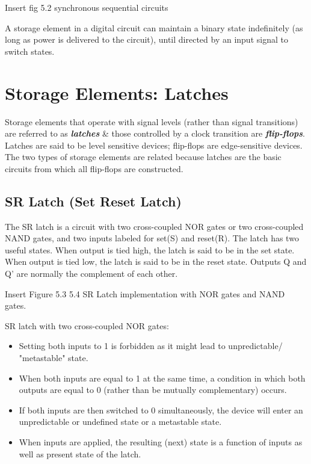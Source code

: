 \begin{highlight}
    Insert fig 5.2 synchronous sequential circuits
\end{highlight}

A storage element in a digital circuit can maintain a binary state indefinitely (as long as power is delivered to the circuit), until directed by an input signal to switch states.

\section{Storage Elements: Latches}
Storage elements that operate with signal levels (rather than signal transitions) are referred to as \textit{\textbf{latches}} \& those controlled by a clock transition are \textit{\textbf{flip-flops}}. Latches are said to be level sensitive devices; flip-flops are edge-sensitive devices. The two types of storage elements are related because latches are the basic circuits from which all flip-flops are constructed.

\subsection{SR Latch (Set Reset Latch)}
The SR latch is a circuit with two cross-coupled NOR gates or two cross-coupled NAND gates, and two inputs labeled for set(S) and reset(R). The latch has two useful states. When output is tied high, the latch is said to be in the set state. When output is tied low, the latch is said to be in the reset state. Outputs Q and Q' are normally the complement of each other.

\begin{highlight}
    Insert Figure 5.3 5.4 SR Latch implementation with NOR gates and NAND gates.
\end{highlight}

SR latch with two cross-coupled NOR gates:
\begin{itemize}
    \item Setting both inputs to 1 is forbidden as it might lead to unpredictable/ "metastable" state.
    \item When both inputs are equal to 1 at the same time, a condition in which both outputs are equal to 0 (rather than be mutually complementary) occurs.
    \item If both inputs are then switched to 0 simultaneously, the device will enter an unpredictable or undefined state or a metastable state.
    \item When inputs are applied, the resulting (next) state is a function of inputs as well as present state of the latch.
\end{itemize}

